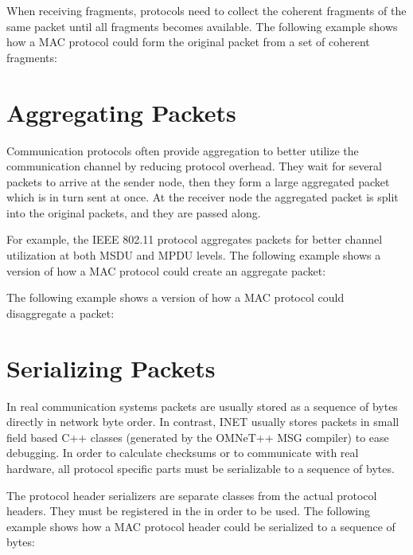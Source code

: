 
When receiving fragments, protocols need to collect the coherent fragments of
the same packet until all fragments becomes available. The following example
shows how a MAC protocol could form the original packet from a set of coherent
fragments:


\section{Aggregating Packets}

Communication protocols often provide aggregation to better utilize the
communication channel by reducing protocol overhead. They wait for several
packets to arrive at the sender node, then they form a large aggregated packet
which is in turn sent at once. At the receiver node the aggregated packet is
split into the original packets, and they are passed along.

For example, the IEEE 802.11 protocol aggregates packets for better channel
utilization at both MSDU and MPDU levels. The following example shows a version
of how a MAC protocol could create an aggregate packet:


The following example shows a version of how a MAC protocol could disaggregate a
packet:


\section{Serializing Packets}

In real communication systems packets are usually stored as a sequence of bytes
directly in network byte order. In contrast, INET usually stores packets in
small field based C++ classes (generated by the OMNeT++ MSG compiler) to ease
debugging. In order to calculate checksums or to communicate with real hardware,
all protocol specific parts must be serializable to a sequence of bytes.

The protocol header serializers are separate classes from the actual protocol
headers. They must be registered in the  in
order to be used. The following example shows how a MAC protocol header could be
serialized to a sequence of bytes:

